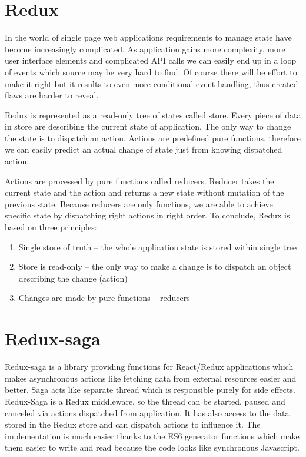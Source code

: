 \section{Redux}
In the world of single page web applications requirements to manage state have become increasingly complicated. As application gains more complexity, more user interface elements and complicated API calls we can easily end up in a loop of events which source may be very hard to find. Of course there will be effort to make it right but it results to even more conditional event handling, thus created flaws are harder to reveal.

Redux is represented as a read-only tree of states called store. Every piece of data in store are describing the current state of application. The only way to change the state is to dispatch an action. Actions are predefined pure functions, therefore we can easily predict an actual change of state just from knowing dispatched action.

Actions are processed by pure functions called reducers. Reducer takes the current state and the action and returns a new state without mutation of the previous state. Because reducers are only functions, we are able to achieve specific state by dispatching right actions in right order. To conclude, Redux is based on three principles\cite{treePrinciples}:
\begin{enumerate}
\item Single store of truth -- the whole application state is stored within single tree
\item Store is read-only -- the only way to make a change is to dispatch an object describing the change (action)
\item Changes are made by pure functions -- reducers 
\end{enumerate}

\section{Redux-saga}
Redux-saga\cite{redux-saga} is a library providing functions for React/Redux applications which makes asynchronous actions like fetching data from external resources easier and better. Saga acts like separate thread which is responsible purely for side effects. Redux-Saga is a Redux middleware, so the thread can be started, paused and canceled via actions dispatched from application. It has also access to the data stored in the Redux store and can dispatch actions to influence it. The implementation is much easier thanks to the ES6 generator functions which make them easier to write and read because the code looks like synchronous Javascript.

